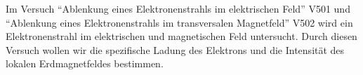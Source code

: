

Im Versuch \enquote{Ablenkung eines Elektronenstrahls im elektrischen Feld} V501 und \enquote{Ablenkung eines Elektronenstrahls im transversalen Magnetfeld} V502 wird ein Elektronenstrahl im elektrischen und magnetischen Feld untersucht. Durch diesen Versuch wollen wir die spezifische Ladung des Elektrons und die Intensität des lokalen Erdmagnetfeldes bestimmen.
